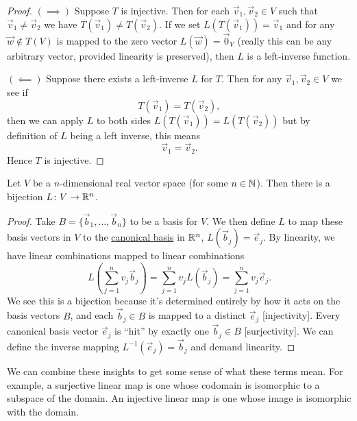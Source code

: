 \begin{proof}
  $(\implies)$
Suppose $T$ is injective. Then for each $\vec{v}_{1},\vec{v}_{2}\in V$
such that $\vec{v}_{1}\neq\vec{v}_{2}$ we have $T(\vec{v}_{1})\neq T(\vec{v}_{2})$.
If we set $L(T(\vec{v}_{1}))=\vec{v}_{1}$ and for any $\vec{w}\notin T(V)$
is mapped to the zero vector $L(\vec{w})=\vec{0}_{V}$ (really this can
be any arbitrary vector, provided linearity is preserved), then $L$ is a
left-inverse function. 

$(\impliedby)$ Suppose there exists a left-inverse $L$ for $T$.
Then for any $\vec{v}_{1},\vec{v}_{2}\in V$ we see if
\begin{equation}
T(\vec{v}_{1})=T(\vec{v}_{2}),
\end{equation}
then we can apply $L$ to both sides
$L\left(T(\vec{v}_{1})\right)=L\left(T(\vec{v}_{2})\right)$ but by
definition of $L$ being a left inverse, this means
\begin{equation}
\vec{v}_{1}=\vec{v}_{2}.
\end{equation}
Hence $T$ is injective.
\end{proof}

\begin{example}
Let $V$ be a $n$-dimensional real vector space (for some $n\in\mathbb{N}$).
Then there is a bijection $L\colon V\to\mathbb{R}^{n}$.

\begin{proof}
Take $B=\{\vec{b}_{1},\dots,\vec{b}_{n}\}$ to be a basis for $V$.
We then define $L$ to map these basis vectors in $V$ to the
\hyperref[ex:basis:canonical-basis]{canonical basis} in $\mathbb{R}^{n}$,
$L(\vec{b}_{j})=\vec{e}_{j}$. By linearity, we have linear combinations
mapped to linear combinations
\begin{equation}
L\left(\sum_{j=1}^{n}v_{j}\vec{b}_{j}\right)=\sum^{n}_{j=1}v_{j}L(\vec{b}_{j})=\sum^{n}_{j=1}v_{j}\vec{e}_{j}.
\end{equation}
We see this is a bijection because it's determined entirely by how it
acts on the basis vectors $B$, and each $\vec{b}_{j}\in B$ is mapped to
a distinct $\vec{e}_{j}$ [injectivity]. Every canonical basis vector
$\vec{e}_{j}$ is ``hit'' by exactly one $\vec{b}_{j}\in B$ [surjectivity].
We can define the inverse mapping $L^{-1}(\vec{e}_{j})=\vec{b}_{j}$ and
demand linearity.
\end{proof}
\end{example}

We can combine these insights to get some sense of what these terms
mean. For example, a surjective linear map is one whose codomain is
isomorphic to a subspace of the domain. An injective linear map is one
whose image is isomorphic with the domain.

